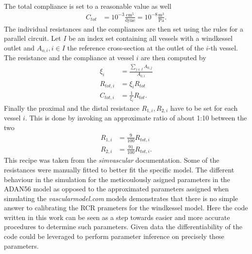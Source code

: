 \documentclass[a4paper, oneside]{discothesis}
\begin{document}
The total compliance is set to a reasonable value as well
\begin{align}
	C_{tot} &= 10^{-3} \frac{\text{cm}^5}{\text{dyne}} = 10^{-8} \frac{\text{m}^3}{\text{Pa}}.
\end{align}
The individual resistances and the compliances are then set using the rules for a parallel circuit.
Let $I$ be an index set containing all vessels with a windkessel outlet and $A_{o,i}, i \in I$ the reference cross-section at the outlet of the $i$-th vessel.
The resistance and the compliance at vessel $i$ are then computed by
\begin{align}
	\xi_i &= \frac{\sum_{j \in I} A_{0,j}}{A_{0,i}} \\
	R_{tot,i} &= \xi_i R_{tot} \\
	C_{tot,i} &= \frac{1}{\xi_i} R_{tot}. 
\end{align}
Finally the proximal and the distal resistance $R_{1,i}, R_{2,i}$ have to be set for each vessel $i$.
This is done by invoking an approximate ratio of about 1:10 between the two
\begin{align}
	R_{1,i} &= \frac{9}{100} R_{tot,i} \\
	R_{2,i} &= \frac{91}{100} R_{tot,i}.
\end{align}
This recipe was taken from the \emph{simvascular} documentation. \cite{simvascular}
Some of the resistances were manually fitted to better fit the specific model.
The different behaviour in the simulation for the meticoulously asigned parameters in the ADAN56 model as opposed to the approximated parameters assigned when simulating the \emph{vascularmodel.com} models demonstrates that there is no simple answer to calibrating the RCR prameters for the windkessel model.
Here the code written in this work can be seen as a step towards easier and more accurate procedures to determine such parameters.
Given data the differentiability of the code could be leveraged to perform parameter inference on precisely these parameters.
\end{document}
